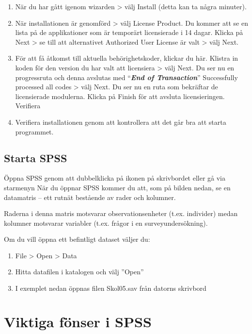 \documentclass[
]{book}
\providecommand{\tightlist}{%
  \setlength{\itemsep}{0pt}\setlength{\parskip}{0pt}}
\begin{document}
\begin{enumerate}
\def\labelenumi{\arabic{enumi}.}
\setcounter{enumi}{1}
\item
  När du har gått igenom wizarden \textgreater{} välj Install (detta kan ta några minuter).
\item
  När installationen är genomförd \textgreater{} välj License Product. Du kommer att se en lista på de applikationer som är temporärt licensierade i 14 dagar. Klicka på Next \textgreater{} se till att alternativet Authorized User License är valt \textgreater{} välj Next.
\item
  För att få åtkomst till aktuella behörighetskoder, klickar du här. Klistra in koden för den version du har valt att licensiera \textgreater{} välj Next. Du ser nu en progressruta och denna avslutas med ``\textbf{\emph{End of Transaction}}'' Successfully processed all codes \textgreater{} välj Next. Du ser nu en ruta som bekräftar de licensierade modulerna. Klicka på Finish för att avsluta licensieringen.
  Verifiera
\item
  Verifiera installationen genom att kontrollera att det går bra att starta programmet.
\end{enumerate}

\hypertarget{starta-spss}{%
\section{Starta SPSS}\label{starta-spss}}

Öppna SPSS genom att dubbelklicka på ikonen på skrivbordet eller gå via starmenyn När du öppnar SPSS kommer du att, som på bilden nedan, se en datamatris -- ett rutnät bestående av rader och kolumner.

Raderna i denna matris motsvarar observationsenheter (t.ex. individer) medan kolumner motsvarar variabler (t.ex. frågor i en surveyundersökning).

Om du vill öppna ett befintligt dataset väljer du:

\begin{enumerate}
\def\labelenumi{\arabic{enumi}.}
\tightlist
\item
  File \textgreater{} Open \textgreater{} Data
\item
  Hitta datafilen i katalogen och välj ''Open''
\item
  I exemplet nedan öppnas filen Skol05.sav från datorns skrivbord
\end{enumerate}

\hypertarget{viktiga-fuxf6nser-i-spss}{%
\chapter{Viktiga fönser i SPSS}\label{viktiga-fuxf6nser-i-spss}}
\end{document}
